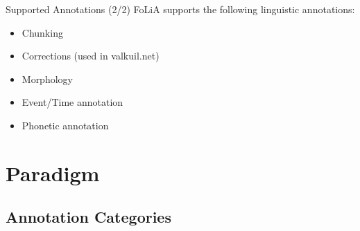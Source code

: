 \documentclass[compress,10pt]{beamer}
\begin{document}
\begin{frame}
    \begin{block}{Supported Annotations (2/2)}
        FoLiA supports the following linguistic annotations:
        \begin{itemize}                       
            \item Chunking
            \item Corrections (used in valkuil.net)
            \item Morphology
            \item Event/Time annotation
            \item Phonetic annotation
        \end{itemize}   
    \end{block}
\end{frame}

        
       
\section{Paradigm}

\subsection{Annotation Categories}
\end{document}
